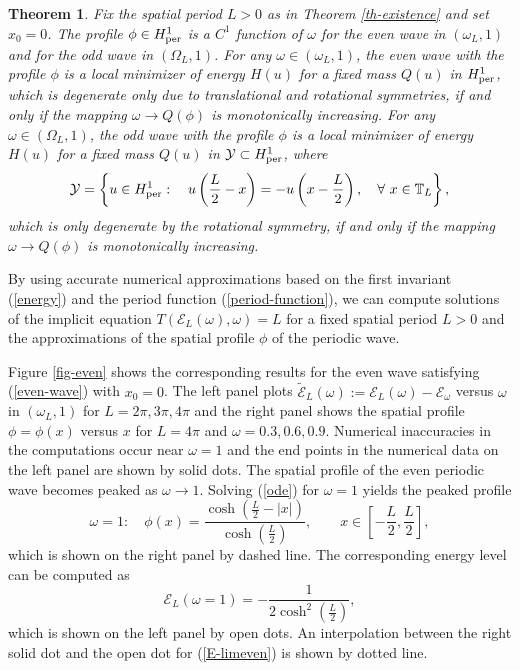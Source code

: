 \documentclass[12pt,reqno]{amsart}
\numberwithin{equation}{section}
\numberwithin{figure}{section}
\newtheorem{theorem}{Theorem}[section]
\begin{document}
\begin{theorem}
	\label{th-stability}
	Fix the spatial period $L > 0$ as in Theorem \ref{th-existence} and set $x_0 = 0$. The profile $\phi \in H^1_{\rm per}$ is a $C^1$ function of $\omega$ for the even wave in $(\omega_L,1)$ and for the odd wave in $(\Omega_L,1)$. 
	For any $\omega \in (\omega_L,1)$, the even wave with the profile $\phi$ is a local minimizer of energy $H(u)$ for a fixed mass $Q(u)$ in $H^1_{\rm per}$, which is degenerate only due to translational and rotational symmetries, if and only if the mapping 
	$\omega \to Q(\phi)$ is monotonically increasing. 
	For any $\omega \in (\Omega_L,1)$, the odd wave with the profile $\phi$ is a local minimizer of energy $H(u)$ for a fixed mass $Q(u)$ in $\mathcal{Y}\subset H^1_{\rm per}$, where 
\begin{equation}
\label{Y-space}
	\mathcal{Y} = \left\{ u \in H^1_{\rm per} : \quad u\left(\frac{L}{2}-x\right) = -u\left(x - \frac{L}{2}\right), \quad \forall\ x \in \mathbb{T}_L \right\},
\end{equation}
 	which is only degenerate by the rotational symmetry, if and only if the mapping 
	$\omega \to Q(\phi)$ is monotonically increasing. 
\end{theorem} 



By using accurate numerical approximations based on the first invariant (\ref{energy}) and the period function (\ref{period-function}), we can compute solutions of the implicit equation $T(\mathcal{E}_L(\omega),\omega) = L$ for a fixed spatial period $L > 0$ and the approximations of the spatial profile $\phi$ of the periodic wave. 

Figure \ref{fig-even} shows the corresponding results 
for the even wave satisfying (\ref{even-wave}) with $x_0 = 0$. The left panel plots $\tilde{\mathcal{E}}_L(\omega) := \mathcal{E}_L(\omega) - \mathcal{E}_{\omega}$ versus $\omega$ in $(\omega_L,1)$ for $L = 2\pi,3\pi,4\pi$ 
and the right panel shows the spatial profile $\phi = \phi(x)$ versus $x$ 
for $L = 4\pi$ and $\omega = 0.3, 0.6, 0.9$. Numerical inaccuracies in the computations occur near $\omega = 1$ and the end points in the numerical data on the left panel are shown by solid dots. The spatial profile of the even periodic wave becomes peaked as $\omega \to 1$. Solving (\ref{ode}) for $\omega = 1$ yields the peaked profile
\begin{equation}
\label{phi-limeven}
\omega = 1 : \quad \phi(x) =  \frac{\cosh \left (\frac{L}{2} - |x| \right)}{\cosh \left (\frac{L}{2} \right )} , \quad \quad x \in \left [-\frac{L}{2}, \frac{L}{2} \right],
\end{equation}
which is shown on the right panel by dashed line. 
The corresponding energy level can be computed as 
\begin{equation}\label{E-limeven}
\mathcal{E}_L(\omega = 1) = - \frac{1}{2\cosh^2 \left(\frac{L}{2}\right)},
\end{equation}
which is shown on the left panel by open dots. An interpolation between 
the right solid dot and the open dot for (\ref{E-limeven}) is shown by 
dotted line.
\end{document}
